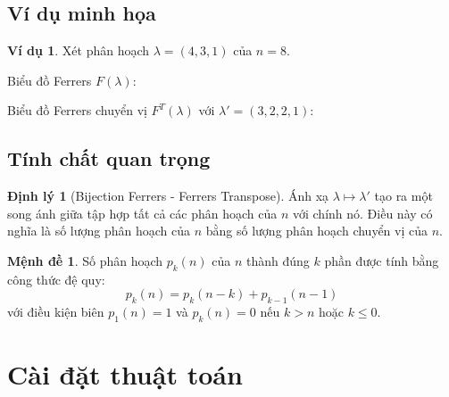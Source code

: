 \documentclass[12pt,a4paper]{article}
\theoremstyle{definition}
\newtheorem{theorem}{Định lý}
\newtheorem{proposition}{Mệnh đề}
\newtheorem{example}{Ví dụ}
\begin{document}
\subsection{Ví dụ minh họa}

\begin{example}
Xét phân hoạch $\lambda = (4, 3, 1)$ của $n = 8$.

Biểu đồ Ferrers $F(\lambda)$:
\begin{center}
\end{center}

Biểu đồ Ferrers chuyển vị $F^T(\lambda)$ với $\lambda' = (3, 2, 2, 1)$:
\begin{center}
\end{center}
\end{example}

\subsection{Tính chất quan trọng}

\begin{theorem}[Bijection Ferrers - Ferrers Transpose]
Ánh xạ $\lambda \mapsto \lambda'$ tạo ra một song ánh giữa tập hợp tất cả các phân hoạch của $n$ với chính nó. Điều này có nghĩa là số lượng phân hoạch của $n$ bằng số lượng phân hoạch chuyển vị của $n$.
\end{theorem}

\begin{proposition}
Số phân hoạch $p_k(n)$ của $n$ thành đúng $k$ phần được tính bằng công thức đệ quy:
$$p_k(n) = p_k(n-k) + p_{k-1}(n-1)$$
với điều kiện biên $p_1(n) = 1$ và $p_k(n) = 0$ nếu $k > n$ hoặc $k \leq 0$.
\end{proposition}

\section{Cài đặt thuật toán}
\end{document}
